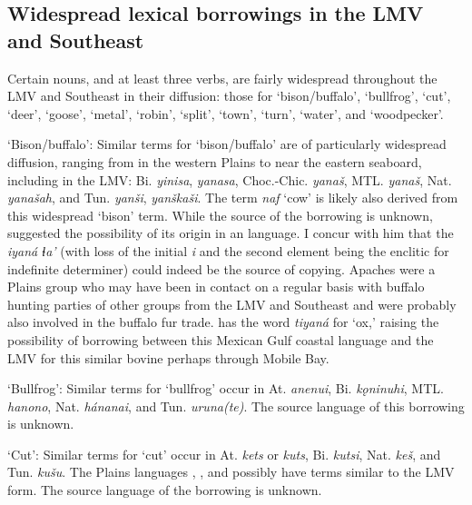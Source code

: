 \documentclass[output=paper]{LSP/langsci}
\begin{document}
\subsection{Widespread lexical borrowings in the LMV and Southeast}

Certain nouns, and at least three verbs, are fairly widespread throughout the LMV and Southeast in their diffusion: those for `bison/buffalo', `bullfrog', `cut', `deer', `goose', `metal', `robin', `split', `town', `turn', `water', and `woodpecker'. 
 


\ea \parbox[t]{.9\textwidth}{`Bison/buffalo': Similar terms for `bison/buffalo' are of particularly widespread diffusion, ranging from  in the western Plains to  near the eastern seaboard, including in the LMV: Bi. \emph{yinisa}, \emph{yanasa}, Choc.-Chic. \emph{yanaš}, MTL. \emph{yanaš}, Nat. \emph{yanašah}, and Tun. \emph{yanši}, \emph{yanškaši}. The  term \emph{naf} `cow' is likely also derived from this widespread `bison' term. While the source of the borrowing is unknown, \citet[166]{Taylor1976b} suggested the possibility of its origin in an  language. I concur with him that the  \emph{iyaná ɬa’} (with loss of the initial \emph{i} and the second element being the enclitic for indefinite determiner) could indeed be the source of copying. Apaches were a Plains group who may have been in contact on a regular basis with buffalo hunting parties of other groups from the LMV and Southeast and were probably also involved in the buffalo fur trade.  has the word \emph{tiyaná} for `ox,' raising the possibility of borrowing between this Mexican Gulf coastal language and the LMV for this similar bovine perhaps through Mobile Bay.}
\z

\ea  \parbox[t]{.9\textwidth}{`Bullfrog': Similar terms for `bullfrog' occur in At. \emph{anenui}, Bi. \emph{kǫninuhi}, MTL. \emph{hanono}, Nat. \emph{hánanai}, and Tun. \emph{uruna(te)}. The source language of this borrowing is unknown.}
\z

\ea  \parbox[t]{.9\textwidth}{`Cut': Similar terms for `cut' occur in At. \emph{kets} or \emph{kuts}, Bi. \emph{kutsi}, Nat. \emph{keš}, and Tun. \emph{kušu}. The Plains languages , , and possibly  have terms similar to the LMV form. The source language of the borrowing is unknown.}
\z
\end{document}
